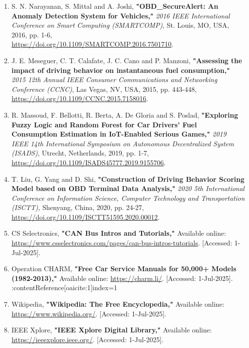 \begin{enumerate}
    \item S. N. Narayanan, S. Mittal and A. Joshi, \textbf{"OBD\_SecureAlert: An Anomaly Detection System for Vehicles,"} \textit{2016 IEEE International Conference on Smart Computing (SMARTCOMP)}, St. Louis, MO, USA, 2016, pp. 1-6,\\ \url{https://doi.org/10.1109/SMARTCOMP.2016.7501710}.

    \item J. E. Meseguer, C. T. Calafate, J. C. Cano and P. Manzoni, \textbf{"Assessing the impact of driving behavior on instantaneous fuel consumption,"} \textit{2015 12th Annual IEEE Consumer Communications and Networking Conference (CCNC)}, Las Vegas, NV, USA, 2015, pp. 443-448, \url{https://doi.org/10.1109/CCNC.2015.7158016}.

    \item R. Massoud, F. Bellotti, R. Berta, A. De Gloria and S. Poslad, \textbf{"Exploring Fuzzy Logic and Random Forest for Car Drivers’ Fuel Consumption Estimation in IoT-Enabled Serious Games,"} \textit{2019 IEEE 14th International Symposium on Autonomous Decentralized System (ISADS)}, Utrecht, Netherlands, 2019, pp. 1-7, \url{https://doi.org/10.1109/ISADS45777.2019.9155706}.

    \item T. Liu, G. Yang and D. Shi, \textbf{"Construction of Driving Behavior Scoring Model based on OBD Terminal Data Analysis,"} \textit{2020 5th International Conference on Information Science, Computer Technology and Transportation (ISCTT)}, Shenyang, China, 2020, pp. 24-27, \url{https://doi.org/10.1109/ISCTT51595.2020.00012}.

    \item CS Selectronics, \textbf{"CAN Bus Intros and Tutorials,"} Available online: \url{https://www.csselectronics.com/pages/can-bus-intros-tutorials}. [Accessed: 1-Jul-2025].

    \item Operation CHARM, \textbf{"Free Car Service Manuals for 50,000+ Models (1982-2013)," } Available online: \url{https://charm.li/}. [Accessed: 1-Jul-2025]. :contentReference[oaicite:1]{index=1}

    \item Wikipedia, \textbf{"Wikipedia: The Free Encyclopedia,"} Available online: \url{https://www.wikipedia.org/}. [Accessed: 1-Jul-2025].

    \item IEEE Xplore, \textbf{"IEEE Xplore Digital Library,"} Available online: \url{https://ieeexplore.ieee.org/}. [Accessed: 1-Jul-2025].


\end{enumerate}
